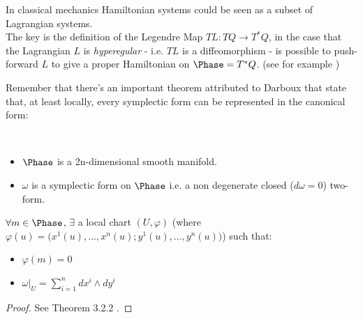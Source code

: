 \documentclass[Main]{subfiles}
\begin{document}
	\begin{observation}
		In classical mechanics Hamiltonian systems could be seen as a subset of Lagrangian systems.
		\\
		The key is the definition of the Legendre Map $TL: TQ \rightarrow T^*Q$,  in the case that the Lagrangian $L$  is \emph{hyperegular}  - i.e. $TL$ is a diffeomorphism - is possible to push-forward $L$ to give a proper Hamiltonian on $\Phase=T^*Q$. (see for example \cite{Abraham1978})
	\end{observation}	
	Remember that there's an important theorem attributed to Darboux that state that, at least locally, every symplectic form can be represented in the canonical form:
	\begin{theorem}[Darboux]
		$ $
		\begin{hypothesis}
			\begin{itemize}
				\item $\Phase$ is a 2n-dimensional smooth manifold.
				\item $\omega$ is a symplectic form on $\Phase$ i.e. a non degenerate closed ($d \omega =0$) two-form.
			\end{itemize}
		\end{hypothesis}
		\begin{thesis}
			 $\forall m\in \Phase$,  $\exists$ a local chart  $(U,\varphi)$ (where $\varphi(u) = \big(x^1(u), \ldots, x^n(u); y^1(u),\ldots, y^n(u) \big)$) such that:
					\begin{itemize}
						\item $\varphi(m) =0$
						\item	$\omega \big\vert_U = \sum_{i=1}^n dx^i \wedge dy^i$
					\end{itemize}
		\end{thesis}
	\end{theorem}
	\begin{proof}
		See Theorem 3.2.2 \cite{Abraham1978}.
	\end{proof}		
		
\end{document}
